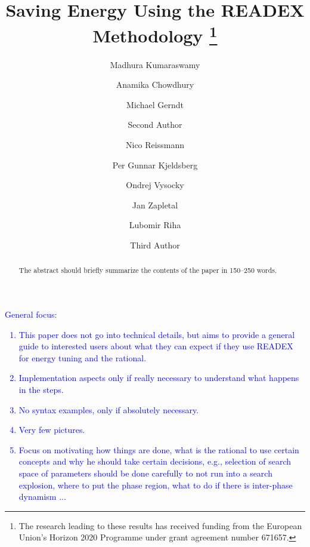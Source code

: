 \documentclass[runningheads]{llncs}
\begin{document}
%
\title{Saving Energy Using the READEX Methodology \thanks{The research leading to these results has received funding from the European Union's Horizon 2020 Programme under grant agreement number 671657.}}
%
%
\author{Madhura Kumaraswamy \and Anamika Chowdhury \and Michael Gerndt  \and
Second Author \and
Nico Reissmann  \and Per Gunnar Kjeldsberg  \and
Ondrej Vysocky  \and Jan Zapletal  \and Lubomir Riha 
\and Third Author}
%
%

\maketitle              %

\begin{abstract}
The abstract should briefly summarize the contents of the paper in
150--250 words.

\end{abstract}

\textcolor{blue}{General focus:
\begin{enumerate}
  \item This paper does not go into technical details, but aims to provide a general guide to interested users about what they can expect if they use READEX for energy tuning and the rational.
  \item Implementation aspects only if really necessary to understand what happens in the steps.
  \item No syntax examples, only if absolutely necessary.
  \item Very few pictures.
  \item Focus on motivating how things are done, what is the rational to use certain concepts and why he should take certain decisions, e.g., selection of search space of parameters should be done carefully to not run into a search explosion, where to put the phase region, what to do if there is inter-phase dynamism ...
\end{enumerate}
}
\end{document}
